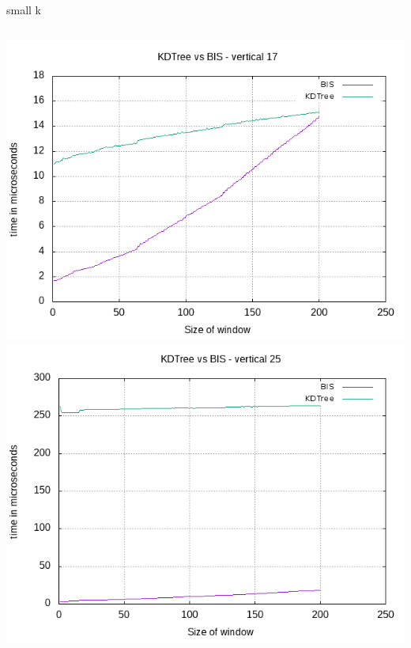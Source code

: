 \documentclass[pdf]{beamer}
\begin{document}
\begin{frame}{small k}
  \begin{columns}
    \includegraphics[scale=0.35]{pictures/analysis/smalls/vert_17.png}
    \includegraphics[scale=0.35]{pictures/analysis/smalls/vert_25.png}
  \end{columns}
\end{frame}
\end{document}
